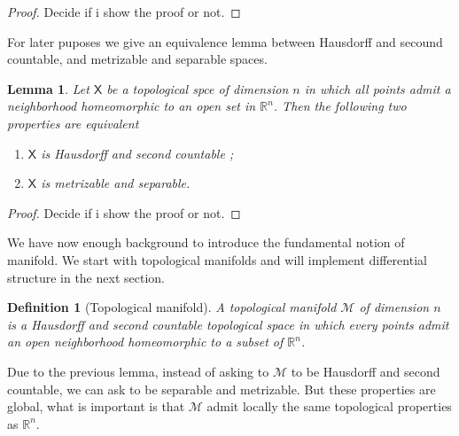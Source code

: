 \documentclass[10pt]{book}
\newcommand{\Mcal}{\mathcal{M}}
\newcommand{\Rbb}{\mathbb{R}}
\newcommand{\Xsf}{\mathsf{X}}
\theoremstyle{break}
\newtheorem{lemma}{Lemma}
\newtheorem{definition}{Definition}
\newtheorem{proof}{Proof}
\begin{document}
\begin{proof}
Decide if i show the proof or not.
\end{proof}


For later puposes we give an equivalence lemma between Hausdorff and secound countable, and metrizable and separable spaces.

\begin{lemma}
Let $\Xsf$ be a topological spce of dimension $n$ in which all points admit a neighborhood homeomorphic to an open set in $\Rbb^n$. Then the following two properties are equivalent
%
\begin{enumerate}
\item $\Xsf$ is Hausdorff and second countable ;
\item $\Xsf$ is metrizable and separable.
\end{enumerate}
%
\end{lemma}


\begin{proof}
Decide if i show the proof or not.
\end{proof}


We have now enough background to introduce the fundamental notion of manifold. We start with topological manifolds and will implement differential structure in the next section.


\begin{definition}[Topological manifold]
A topological manifold $\Mcal$ of dimension $n$ is a Hausdorff and second countable topological space in which every points admit an open neighborhood homeomorphic to a subset of $\Rbb^n$.
\end{definition}

Due to the previous lemma, instead of asking to $\Mcal$ to be Hausdorff and second countable, we can ask to be separable and metrizable. But these properties are global, what is important is that $\Mcal$ admit locally the same topological properties as $\Rbb^n$.\par%
\end{document}
